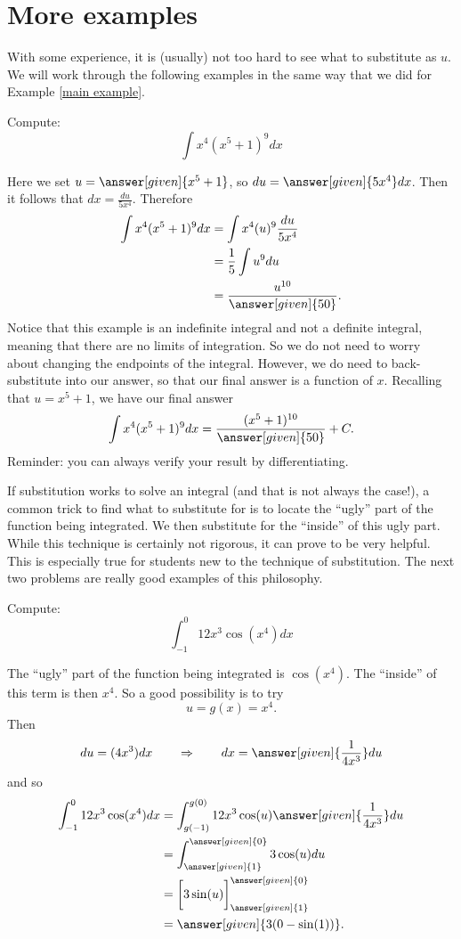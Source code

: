 \documentclass{ximera}
\begin{document}
\section{More examples}

With some experience, it is (usually) not too hard to see what to
substitute as $u$.  We will work through the following examples in the
same way that we did for Example \ref{main example}.
\begin{example}
Compute:
\[
\int x^4(x^5+1)^{9} dx
\]
\begin{explanation}
Here we set $u =  \answer[given]{x^5+1}$, so $du =  \answer[given]{5x^4} dx$.  Then
it follows that $dx=\frac{du}{5x^4}$. Therefore
\begin{align*}
  \int x^4(x^5+1)^{9} dx &= \int x^4 (u)^{9} \frac{du}{5x^4} \\
  &= \frac{1}{5} \int u^{9} du\\
&=\frac{u^{10}}{ \answer[given]{50}}.
\end{align*}
Notice that this example is an indefinite integral and not a definite
integral, meaning that there are no limits of integration.  So we do
not need to worry about changing the endpoints of the integral.  However,
we do need to back-substitute into our answer, so that our final
answer is a function of $x$.  Recalling that $u= x^5+1$, we have
our final answer
\[
\int x^4(x^5+1)^{9} dx= \frac{(x^5+1)^{10}}{\answer[given]{50}}+C.
\]
Reminder: you can always verify your result by differentiating.

\end{explanation}
\end{example}


If substitution works to solve an integral (and that is not always the
case!), a common trick to find what to substitute for is to locate the
``ugly'' part of the function being integrated.  We then substitute
for the ``inside'' of this ugly part.  While this technique is
certainly not rigorous, it can prove to be very helpful.  This is
especially true for students new to the technique of substitution.
The next two problems are really good examples of this philosophy.

\begin{example}
Compute:
\[
\int_{-1}^0 12x^3 \cos({x^4}) dx
\]
\begin{explanation}
The ``ugly'' part of the function being integrated is $\cos({x^4})$.  The
``inside'' of this term is then $x^4$.  So a good possibility is to
try
\[
u =g(x)= x^4.
\]
Then
\[
du = (4x^3) dx 	\qquad	\Rightarrow	\qquad	dx = \answer[given]{\frac{1}{4x^3}} du
\]
and so
\begin{align*}
\int_{-1}^0 12x^3 \cos({x^4}) dx &= \int_{g(-1)}^{g(0)} 12 x^3 \cos({u}) \answer[given]{\frac{1}{4x^3}} du  \\
&= \int_{\answer[given]{1}}^{\answer[given]{0}} 3 \cos({u}) du  \\
&= \bigg[ 3\sin({u}) \bigg]_{\answer[given]{1}}^{\answer[given]{0}}  \\
&= \answer[given]{3(0-\sin({1}))}.
\end{align*}
\end{explanation}
\end{example}
\end{document}
